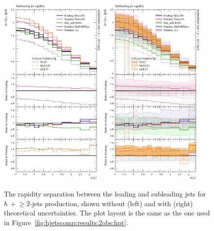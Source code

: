 \begin{figure}[t!]
  \centering
  \includegraphics[width=0.47\textwidth]{figures/hjetscomp_u_jet2_y.pdf}
  \hfill
  \includegraphics[width=0.47\textwidth]{figures/hjetscomp_jet2_y.pdf}
  \caption{\label{fig:hjetscomp:results:2obs:j2y}%
    The rapidity separation between the leading and subleading jets
    for $h\,+\!\ge\!\!2$-jets production, shown without (left) and with
    (right) theoretical uncertainties. The plot layout is the same as
    the one used in Figure~\ref{fig:hjetscomp:results:2obs:hpt}.}
\end{figure}

